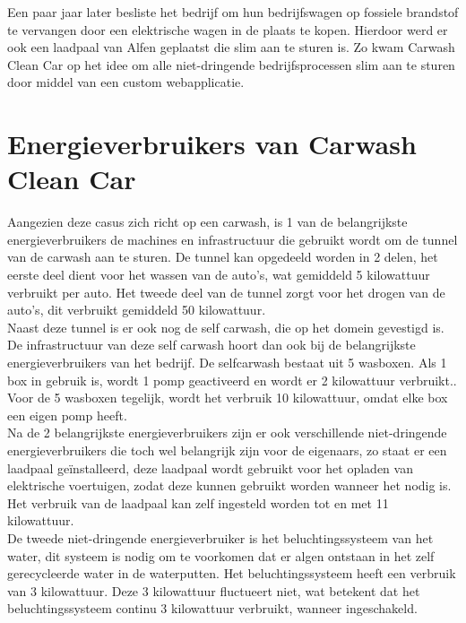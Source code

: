 \pagebreak

Een paar jaar later besliste het bedrijf om hun bedrijfswagen op fossiele brandstof te vervangen door een elektrische wagen in de plaats te kopen. Hierdoor werd er ook een laadpaal van Alfen geplaatst die slim aan te sturen is. Zo kwam Carwash Clean Car op het idee om alle niet-dringende bedrijfsprocessen slim aan te sturen door middel van een custom webapplicatie.

\section{Energieverbruikers van Carwash Clean Car}
\label{sec:stand-van-zaken-energieverbruikers}

Aangezien deze casus zich richt op een carwash, is 1 van de belangrijkste energieverbruikers de machines en infrastructuur die gebruikt wordt om de tunnel van de carwash aan te sturen. De tunnel kan opgedeeld worden in 2 delen, het eerste deel dient voor het wassen van de auto's, wat gemiddeld 5 kilowattuur verbruikt per auto. Het tweede deel van de tunnel zorgt voor het drogen van de auto's, dit verbruikt gemiddeld 50 kilowattuur.\\

Naast deze tunnel is er ook nog de self carwash, die op het domein gevestigd is. De infrastructuur van deze self carwash hoort dan ook bij de belangrijkste energieverbruikers van het bedrijf. De selfcarwash bestaat uit 5 wasboxen. Als 1 box in gebruik is, wordt 1 pomp geactiveerd en wordt er 2 kilowattuur verbruikt.. Voor de 5 wasboxen tegelijk, wordt het verbruik 10 kilowattuur, omdat elke box een eigen pomp heeft.\\

Na de 2 belangrijkste energieverbruikers zijn er ook verschillende niet-dringende energieverbruikers die toch wel belangrijk zijn voor de eigenaars, zo staat er een laadpaal geïnstalleerd, deze laadpaal wordt gebruikt voor het opladen van elektrische voertuigen, zodat deze kunnen gebruikt worden wanneer het nodig is. Het verbruik van de laadpaal kan zelf ingesteld worden tot en met 11 kilowattuur.\\

De tweede niet-dringende energieverbruiker is het beluchtingssysteem van het water, dit systeem is nodig om te voorkomen dat er algen ontstaan in het zelf gerecycleerde water in de waterputten. Het beluchtingssysteem heeft een verbruik van 3 kilowattuur. Deze 3 kilowattuur fluctueert niet, wat betekent dat het beluchtingssysteem continu 3 kilowattuur verbruikt, wanneer ingeschakeld.\\

